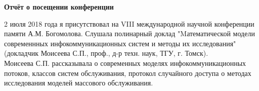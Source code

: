 \documentclass{article}
\begin{document}
\pagestyle{empty}
\begin{center}
\textbf{Отчёт о посещении конференции}
\end{center}
2 июля 2018 года я присутствовал на VIII 
международной научной конференции памяти
А.М. Богомолова. Слушала полинарный доклад 
"Mатематической модели современнных
инфокоммуникационных систем и методы их исследования" 
(докладчик Моисеева С.П.,
проф., д-р техн. наук, ТГУ, г. Томск).\\
Моисеева С.П. рассказывала о современных моделях 
инфокоммуникационных потоков,
классов систем обслуживания, протокол случайного 
доступа о методах исследования 
моделей массового обслуживания.
\end{document}
